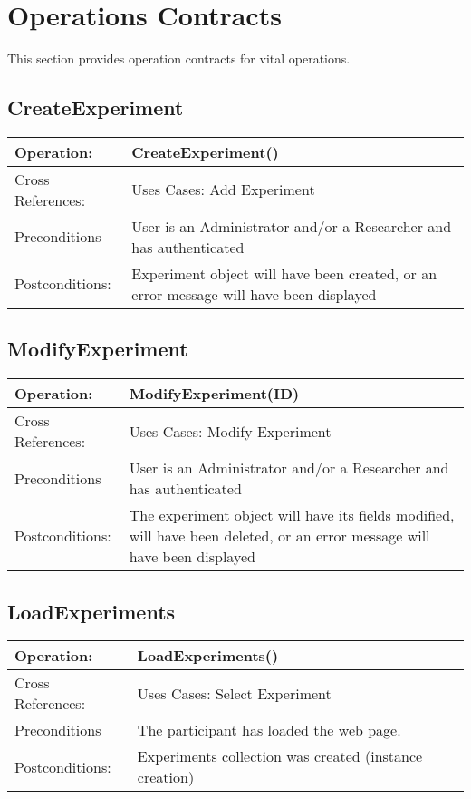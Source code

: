 \section{Operations Contracts}
This section provides operation contracts for vital operations.

\subsection{CreateExperiment}
\begin{tabular}{|l|l|}
\hline Operation: & CreateExperiment() \\ 
\hline Cross References: & Uses Cases: Add Experiment \\ 
\hline Preconditions & User is an Administrator and/or a Researcher and has authenticated \\ 
\hline Postconditions: & Experiment object will have been created, or an error message will have been displayed \\
\hline 
\end{tabular}

\subsection{ModifyExperiment}
\begin{tabular}{|l|p{5.5in}|}
\hline Operation: & ModifyExperiment(ID) \\ 
\hline Cross References: & Uses Cases: Modify Experiment \\ 
\hline Preconditions & User is an Administrator and/or a Researcher and has authenticated \\ 
\hline Postconditions: & The experiment object will have its fields modified, will have been deleted, or an error message will have been displayed \\
\hline 
\end{tabular}

\subsection{LoadExperiments}
\begin{tabular}{|l|l|}
\hline Operation: & LoadExperiments() \\ 
\hline Cross References: & Uses Cases: Select Experiment \\ 
\hline Preconditions & The participant has loaded the web page. \\ 
\hline Postconditions: & Experiments collection was created (instance creation) \\
\hline 
\end{tabular}

